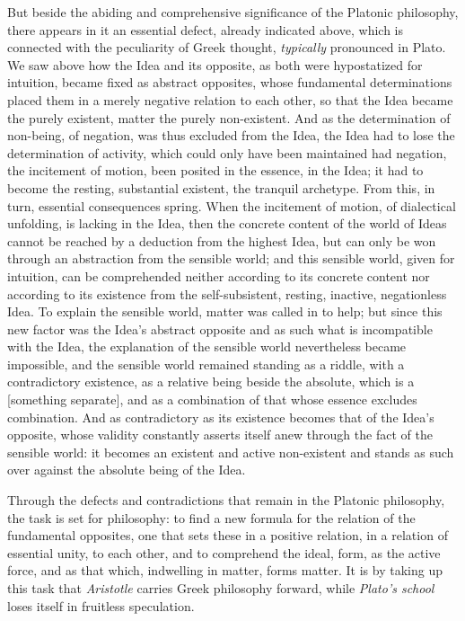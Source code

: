 But beside the abiding
and comprehensive significance of the Platonic philosophy, there appears in it an essential defect, already
indicated above, which is connected with
the peculiarity of Greek thought, \emph{typically} pronounced in Plato. We saw above how the Idea and its opposite, as both were hypostatized for intuition, became fixed
as abstract opposites, whose fundamental determinations placed
them in a merely negative relation to each other, so that the Idea
became the purely existent, matter the purely non-existent. And
as the determination of non-being, of negation, was thus excluded from the Idea, the Idea had to lose the determination of activity, which could only have been maintained had negation, the incitement of motion, been posited in the essence, in the Idea;
it had to become the resting, substantial existent, the
tranquil archetype. From this, in turn, essential consequences spring. When the incitement of motion, of dialectical unfolding,
is lacking in the Idea, then the concrete content of the world of Ideas
cannot be reached by a deduction from the highest Idea,
but can only be won through an abstraction from the sensible world; and this sensible world, given for intuition, can
be comprehended neither according to its concrete content nor according to its existence
from the self-subsistent, resting, inactive,
negationless Idea. To explain the sensible world, matter was called in
to help; but since this new factor was the Idea's
abstract opposite and as such what is incompatible with the Idea, the explanation of the sensible world nevertheless became impossible, and
the sensible world remained standing as a riddle, with a contradictory existence, as a relative being beside the
absolute, which is a  [something separate], and as a combination of that
whose essence excludes combination. And as contradictory as its
existence becomes that of the Idea's opposite, whose validity constantly
asserts itself anew through the fact of the sensible world:
it becomes an existent and active non-existent and stands
as such over against the absolute being of the Idea.

Through the defects and contradictions that remain in the
Platonic philosophy, the task is set for philosophy:
to find a new formula for the relation of the fundamental opposites, one that
sets these in a positive relation, in a relation of essential unity, to
each other, and to comprehend the ideal, form, as the active force, and as that which, indwelling in matter, forms
matter. It is by taking up this task that \emph{Aristotle}
carries Greek philosophy forward, while \emph{Plato's school}
loses itself in fruitless speculation.

